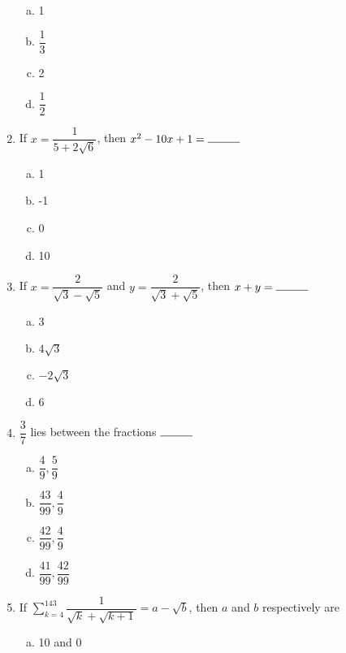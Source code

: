 \begin{multicols}{2}
\begin{enumerate}
\begin{multicols}{2}
\begin{enumerate}[(a)]
\item 1
\item $\dfrac{1}{3}$
\item 2
\item $\dfrac{1}{2}$
\end{enumerate}
\end{multicols}
\item If $x = \dfrac{1}{5+2\sqrt{6}}$, then $x^2-10x+1 = \rule{1cm}{0.15mm}$
\begin{multicols}{2}
\begin{enumerate}[(a)]
\item 1
\item -1
\item 0
\item 10
\end{enumerate}
\end{multicols}
\item If $x = \dfrac{2}{\sqrt{3}-\sqrt{5}}$ and $y = \dfrac{2}{\sqrt{3}+\sqrt{5}}$, then $x+y = \rule{1cm}{0.15mm}$
\begin{multicols}{2}
\begin{enumerate}[(a)]
\item 3
\item $4\sqrt{3}$
\item $-2\sqrt{3}$
\item 6
\end{enumerate}
\end{multicols}
\item $\dfrac{3}{7}$ lies between the fractions $\rule{1cm}{0.15mm}$
\begin{multicols}{2}
\begin{enumerate}[(a)]
\item $\dfrac{4}{9}, \dfrac{5}{9}$
\item $\dfrac{43}{99}, \dfrac{4}{9}$
\item $\dfrac{42}{99}, \dfrac{4}{9}$
\item $\dfrac{41}{99}, \dfrac{42}{99}$
\end{enumerate}
\end{multicols}
\item If $\sum_{k=4}^{143} \dfrac{1}{\sqrt{k}+\sqrt{k+1}} = a-\sqrt{b}$, then $a$ and $b$ respectively are
\begin{multicols}{2}
\begin{enumerate}[(a)]
\item 10 and 0

\end{enumerate}
\end{multicols}
\end{enumerate}
\end{multicols}
